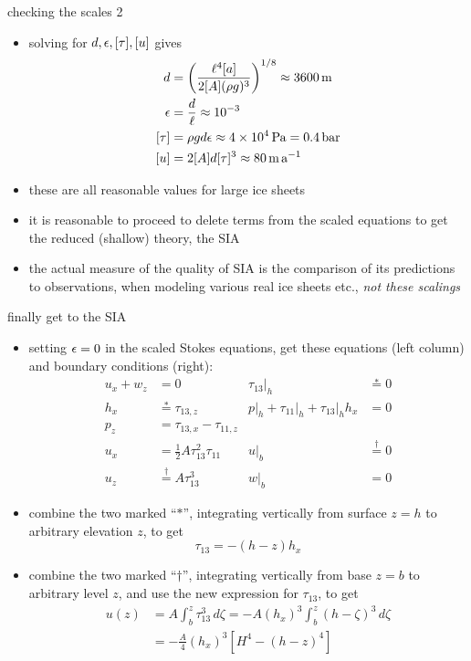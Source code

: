 \begin{frame}{checking the scales 2}

\begin{itemize}
\item solving for $d,\epsilon,[\tau],[u]$ gives
  \begin{align*}
  d &= \left(\frac{\ell^4 [a]}{2 [A] (\rho g)^3}\right)^{1/8} \approx 3600\,\text{m} \\
  \epsilon &= \frac{d}{\ell} \approx 10^{-3} \\
  [\tau] &= \rho g d \epsilon \approx 4 \times 10^4\, \text{Pa} = 0.4\,\text{bar}\\
  [u] &= 2 [A] d [\tau]^3 \approx 80\,\text{m}\,\text{a}^{-1}
  \end{align*}
\item these are all reasonable values for large ice sheets
\item it is reasonable to proceed to delete terms from the scaled equations to get the reduced (shallow) theory, the SIA
\item the actual measure of the quality of SIA is the comparison of its predictions to observations, when modeling various real ice sheets etc., \emph{not these scalings}
\end{itemize}
\end{frame}


\begin{frame}{finally get to the SIA}
\label{slide:siafinally}

\small
\begin{itemize}
\item setting $\epsilon=0$ in the scaled Stokes equations, get these equations (left column) and boundary conditions (right):
\begin{align*}
u_x + w_z &= 0                          & \tau_{13}\big|_h &\stackrel{\ast}{=} 0 \\
h_x &\stackrel{\ast}{=} \tau_{13,z}                      & p\big|_h + \tau_{11}\big|_h + \tau_{13}\big|_h h_x &= 0\\
p_z &= \tau_{13,x} - \tau_{11,z}        & & \\
u_x &= \frac{1}{2} A \tau_{13}^2 \tau_{11} & u\big|_b &\stackrel{\dagger}{=} 0 \\
u_z &\stackrel{\dagger}{=} A \tau_{13}^3 & w\big|_b &= 0
\end{align*}
\item combine the two marked ``$\ast$'', integrating vertically from surface $z=h$ to arbitrary elevation $z$, to get
	$$\tau_{13} = - (h - z) h_x$$
\item combine the two marked ``$\dagger$'', integrating vertically from base $z=b$ to arbitrary level $z$, and use the new expression for $\tau_{13}$, to get
\begin{align*}
u(z) &= A \int_b^z \tau_{13}^3\,d\zeta = - A (h_x)^3 \int_b^z (h - \zeta)^3\,d\zeta \\
     &= -\frac{A}{4} (h_x)^3 \left[H^4 - (h - z)^4\right]
\end{align*}

\end{itemize}
\end{frame}


